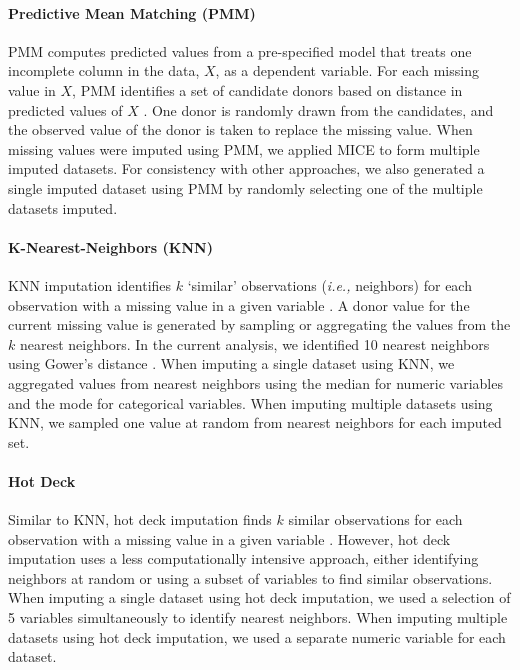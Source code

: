 \documentclass{article}
\begin{document}
\paragraph{Predictive Mean Matching (PMM)}

PMM computes predicted values from a pre-specified model that treats one
incomplete column in the data, \(X\), as a dependent variable. For each
missing value in \(X\), PMM identifies a set of candidate donors based
on distance in predicted values of \(X\) \cite{landerman1997empirical}.
One donor is randomly drawn from the candidates, and the observed value
of the donor is taken to replace the missing value. When missing values
were imputed using PMM, we applied MICE to form multiple imputed
datasets. For consistency with other approaches, we also generated a
single imputed dataset using PMM by randomly selecting one of the
multiple datasets imputed.

\paragraph{K-Nearest-Neighbors (KNN)}

KNN imputation identifies \(k\) `similar' observations
(\textit{i.e., }neighbors) for each observation with a missing value in
a given variable \cite{chen2000nearest}. A donor value for the current
missing value is generated by sampling or aggregating the values from
the \(k\) nearest neighbors. In the current analysis, we identified 10
nearest neighbors using Gower's distance \cite{gower}. When imputing a
single dataset using KNN, we aggregated values from nearest neighbors
using the median for numeric variables and the mode for categorical
variables. When imputing multiple datasets using KNN, we sampled one
value at random from nearest neighbors for each imputed set.

\paragraph{Hot Deck}

Similar to KNN, hot deck imputation finds \(k\) similar observations for
each observation with a missing value in a given variable
\cite{andridge2010hotdeck}. However, hot deck imputation uses a less
computationally intensive approach, either identifying neighbors at
random or using a subset of variables to find similar observations. When
imputing a single dataset using hot deck imputation, we used a selection
of 5 variables simultaneously to identify nearest neighbors. When
imputing multiple datasets using hot deck imputation, we used a separate
numeric variable for each dataset.
\end{document}
